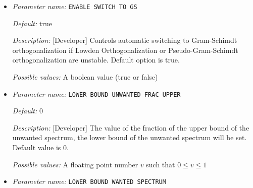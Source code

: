 \begin{itemize}


{\it Default:} 0


{\it Description:} [Developer] The degree of the Chebyshev polynomial to be employed for filtering out the unwanted spectrum. A heuristics value depending upon the upper bound of the eigen spectrum is used when the parameter value is 0, which is the default option.


{\it Possible values:} An integer $n$ such that $0\leq n \leq 2000$
\item {\it Parameter name:} {\tt ENABLE SWITCH TO GS}
\label{parameters:SCF parameters/Eigen_2dsolver_2fChebyshev solver related parameters/ENABLE SWITCH TO GS}
\label{parameters:SCF_20parameters/Eigen_2dsolver_2fChebyshev_20solver_20related_20parameters/ENABLE_20SWITCH_20TO_20GS}




{\it Default:} true


{\it Description:} [Developer] Controls automatic switching to Gram-Schimdt orthogonalization if Lowden Orthogonalization or Pseudo-Gram-Schimdt orthogonalization are unstable. Default option is true.


{\it Possible values:} A boolean value (true or false)
\item {\it Parameter name:} {\tt LOWER BOUND UNWANTED FRAC UPPER}
\label{parameters:SCF parameters/Eigen_2dsolver_2fChebyshev solver related parameters/LOWER BOUND UNWANTED FRAC UPPER}
\label{parameters:SCF_20parameters/Eigen_2dsolver_2fChebyshev_20solver_20related_20parameters/LOWER_20BOUND_20UNWANTED_20FRAC_20UPPER}




{\it Default:} 0


{\it Description:} [Developer] The value of the fraction of the upper bound of the unwanted spectrum, the lower bound of the unwanted spectrum will be set. Default value is 0.


{\it Possible values:} A floating point number $v$ such that $0 \leq v \leq 1$
\item {\it Parameter name:} {\tt LOWER BOUND WANTED SPECTRUM}
\label{parameters:SCF parameters/Eigen_2dsolver_2fChebyshev solver related parameters/LOWER BOUND WANTED SPECTRUM}
\label{parameters:SCF_20parameters/Eigen_2dsolver_2fChebyshev_20solver_20related_20parameters/LOWER_20BOUND_20WANTED_20SPECTRUM}



\end{itemize}

